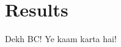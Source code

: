 \documentclass[../main.tex]{subfiles}
\begin{document}
\section{Results}
Dekh BC! Ye kaam karta hai!
\end{document}
